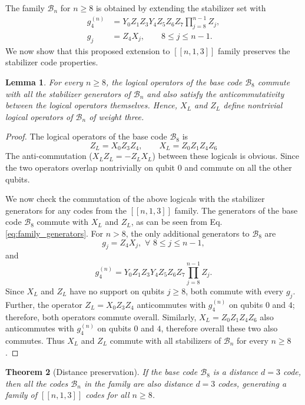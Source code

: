 \documentclass[reprint, amsmath,amssymb, aps,pra,
 floatfix,
]{revtex4-2}
\newtheorem{theorem}{Theorem}
\newtheorem{lemma}[theorem]{Lemma}
\begin{document}
\noindent The family $\mathcal{B}_n$ for $n\ge 8$ is obtained by extending the stabilizer set with
\begin{align}
g_4^{(n)} &= Y_0 Z_1Z_3 Y_4 Z_5Z_6 Z_7 \prod_{j=8}^{n-1} Z_j, \nonumber\\
g_j &= Z_4 X_j, \qquad 8 \le j \le n-1.
\end{align}
We now show that this proposed extension to $[[n,1,3]]$ family preserves the stabilizer code properties.





\begin{lemma}
\label{lem:logical_commutation}
For every $n\ge 8$, the logical operators of the base code $\mathcal{B}_8$ commute with all the stabilizer generators of $\mathcal{B}_n$ and also satisfy the anticommutativity between the logical operators themselves.
Hence, $X_L$ and $Z_L$ define nontrivial logical operators of $\mathcal{B}_n$ of weight three.
\end{lemma}

\begin{proof}
The logical operators of the base code $\mathcal{B}_8$ is
\[
Z_L = X_0 Z_3 Z_4, \qquad X_L = Z_0 Z_1 Z_4Z_6
\]
The anti-commutation ($X_L Z_L=-Z_L X_L$) between these logicals is obvious.
Since the two operators overlap nontrivially on qubit $0$ and commute on all the other qubits.

\noindent We now check the commutation of the above logicals with the stabilizer generators for any codes from the $[[n,1,3]]$ family.
The generators of the base code $\mathcal{B}_8$ commute with $X_L$ and $Z_L$, as can be seen from Eq. \ref{eq:family_generators}. 
For $n>8$, the only additional generators to $\mathcal{B}_8$ are
\[
g_j = Z_4 X_j, \,\,\forall \,\, 8\le j\le n-1,
\]
and
\[
g_4^{(n)} = Y_0 Z_1Z_3 Y_4 Z_5Z_6 Z_7 \prod_{j=8}^{n-1} Z_j.
\]
\noindent Since $X_L$ and $Z_L$ have no support on qubits $j\ge 8$, both commute with every $g_j$. 
Further, the operator $Z_L=X_0Z_3Z_4$ anticommutes with $g_4^{(n)}$ on qubits $0$ and $4$; therefore, both operators commute overall. 
Similarly, $X_L=Z_0Z_1Z_4Z_6$ also anticommutes with $g_4^{(n)}$ on qubits $0$ and $4$, therefore overall these two also commutes.
Thus $X_L$ and $Z_L$ commute with all stabilizers of $\mathcal{B}_n$ for every $n\ge 8$.
\end{proof}

\begin{theorem}[Distance preservation]
\label{thm:distance}
If the base code $\mathcal{B}_8$ is a distance $d=3$ code, then all the codes $\mathcal{B}_n$ in the family are also distance $d = 3$ codes, generating a family of $[[n,1,3]]$ codes for all $n \ge 8$.
\end{theorem}
\end{document}
